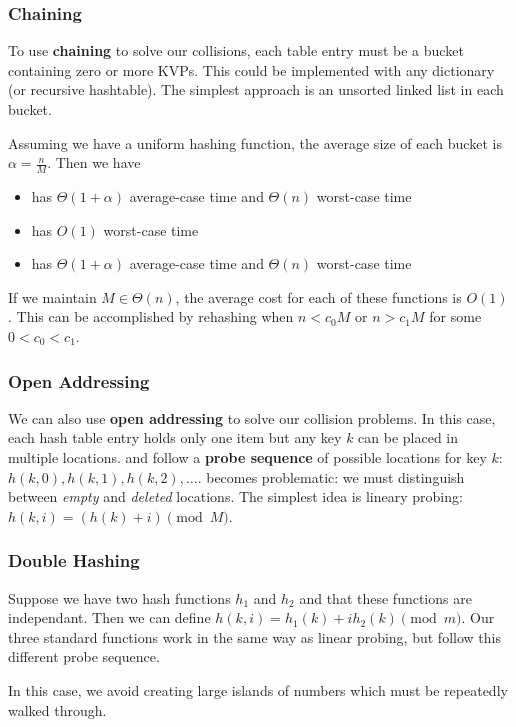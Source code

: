\documentclass[12pt]{article}
\begin{document}
\subsubsection{Chaining}
To use {\bf chaining} to solve our collisions, each table entry must be a bucket containing zero or more KVPs. This could be implemented with any dictionary (or recursive hashtable). The simplest approach is an unsorted linked list in each bucket.

Assuming we have a uniform hashing function, the average size of each bucket is $\alpha = \frac{n}{M}$. Then we have
\begin{itemize}
\item {} has $\Theta(1+\alpha)$ average-case time and $\Theta(n)$ worst-case time
\item {} has $O(1)$ worst-case time
\item {} has $\Theta(1+\alpha)$ average-case time and $\Theta(n)$ worst-case time
\end{itemize}

If we maintain $M \in \Theta(n)$, the average cost for each of these functions is $O(1)$. This can be accomplished by rehashing when $n < c_0M$ or $n > c_1M$ for some $0 < c_0 < c_1$.

\subsubsection{Open Addressing}
We can also use {\bf open addressing} to solve our collision problems. In this case, each hash table entry holds only one item but any key $k$ can be placed in multiple locations.  and  follow a {\bf probe sequence} of possible locations for key $k$: $h(k,0), h(k,1), h(k,2), \dots$.  becomes problematic: we must distinguish between \emph{empty} and \emph{deleted} locations. The simplest idea is lineary probing: $h(k,i) = (h(k) + i) \pmod M$.

\subsubsection{Double Hashing}
Suppose we have two hash functions $h_1$ and $h_2$ and that these functions are independant. Then we can define $h(k,i) = h_1(k) + ih_2(k) \pmod m$. Our three standard functions work in the same way as linear probing, but follow this different probe sequence.

In this case, we avoid creating large islands of numbers which must be repeatedly walked through.
\end{document}
